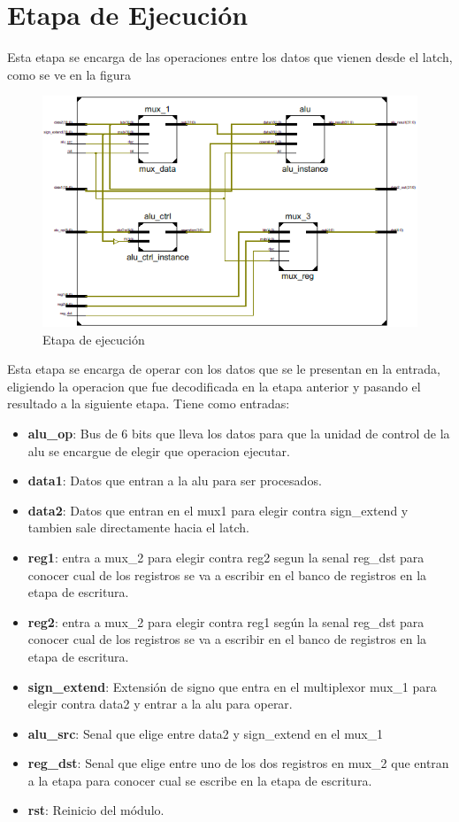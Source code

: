 \section{Etapa de Ejecuci\'on}
Esta etapa se encarga de las operaciones entre los datos que vienen desde el latch, como se ve en la figura 

\begin{figure}[H]
\centering
\includegraphics[scale=0.5]{img/execute_stage_inside}
\caption{Etapa de ejecuci\'on}
\label{fig:fetch}
\end{figure}

Esta etapa se encarga de operar con los datos que se le presentan en la entrada, eligiendo la operacion que fue decodificada en la etapa anterior y pasando el resultado a la siguiente etapa.
Tiene como entradas:

\begin{itemize}
  \item \textbf{alu\_op}: Bus de 6 bits que lleva los datos para que la unidad de control de la alu se encargue de elegir que operacion ejecutar.	
  \item \textbf{data1}: Datos que entran a la alu para ser procesados.
  \item \textbf{data2}: Datos que entran en el mux1 para elegir contra sign\_extend y tambien sale directamente hacia el latch.
  \item \textbf{reg1}: entra a mux\_2 para elegir contra reg2 segun la senal reg\_dst para conocer cual de los registros se va a escribir en el banco de registros en la etapa de escritura.
  \item \textbf{reg2}: entra a mux\_2 para elegir contra reg1 seg\'un la senal reg\_dst para conocer cual de los registros se va a escribir en el banco de registros en la etapa de escritura. 	
  \item \textbf{sign\_extend}: Extensi\'on de signo que entra en el multiplexor mux\_1 para elegir contra data2 y entrar a la alu para operar.
  \item \textbf{alu\_src}: Senal que elige entre data2 y sign\_extend en el mux\_1
  \item \textbf{reg\_dst}: Senal que elige entre uno de los dos registros en mux\_2 que entran a la etapa para conocer cual se escribe en la etapa de escritura.
  \item \textbf{rst}: Reinicio del m\'odulo. 
\end{itemize}

